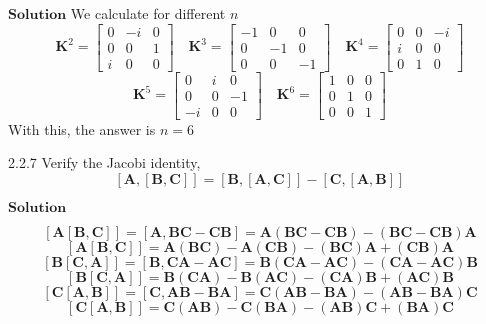 \documentclass{article}
\begin{document}
\begin{flushleft}
$\boxed{\textbf{Solution}}$ We calculate for different $n$
$$\mathbf{K}^2 = \begin{bmatrix}{0} & {-i} & {0} \\ {0} & {0} & {1} \\ {i} & {0} & {0}\end{bmatrix} \quad \mathbf{K}^3=\begin{bmatrix}{-1} & {0} & {0} \\ {0} & {-1} & {0} \\ {0} & {0} & {-1}\end{bmatrix} \quad \mathbf{K}^4 = \begin{bmatrix}{0} & {0} & {-i} \\ {i} & {0} & {0} \\ {0} & {1} & {0}\end{bmatrix}$$
$$\mathbf{K}^5 = \begin{bmatrix}{0} & {i} & {0} \\ {0} & {0} & {-1} \\ {-i} & {0} & {0}\end{bmatrix} \quad \mathbf{K}^6 = \begin{bmatrix}{1} & {0} & {0} \\ {0} & {1} & {0} \\ {0} & {0} & {1}\end{bmatrix}$$
With this, the answer is $n=6$


\newpage


\begin{mybox}{2.2.7}
Verify the Jacobi identity,
$$[\mathbf{A},[\mathbf{B}, \mathbf{C}]]=[\mathbf{B},[\mathbf{A}, \mathbf{C}]]-[\mathbf{C},[\mathbf{A}, \mathbf{B}]]$$
\end{mybox}

$\boxed{\textbf{Solution}}$ 

$$
[\mathbf{A}[\mathbf{B}, \mathbf{C}]]=[\mathbf{A}, \mathbf{B} \mathbf{C}-\mathbf{C} \mathbf{B}]=\mathbf{A}(\mathbf{B} \mathbf{C}-\mathbf{C} \mathbf{B})-(\mathbf{B} \mathbf{C}-\mathbf{C} \mathbf{B}) \mathbf{A} $$
$$[\mathbf{A}[\mathbf{B}, \mathbf{C}]]=\mathbf{A}(\mathbf{B} \mathbf{C})-\mathbf{A}(\mathbf{C} \mathbf{B})-(\mathbf{B} \mathbf{C}) \mathbf{A}+(\mathbf{C} \mathbf{B}) \mathbf{A} $$
$$[\mathbf{B}[\mathbf{C}, \mathbf{A}]]=[\mathbf{B}, \mathbf{C} \mathbf{A}-\mathbf{A} \mathbf{C}]=\mathbf{B}(\mathbf{C A}-\mathbf{A} \mathbf{C})-(\mathbf{C A}-\mathbf{A} \mathbf{C}) \mathbf{B} $$
$$[\mathbf{B}[\mathbf{C}, \mathbf{A}]]=\mathbf{B}(\mathbf{C} \mathbf{A})-\mathbf{B}(\mathbf{A} \mathbf{C})-(\mathbf{C} \mathbf{A}) \mathbf{B}+(\mathbf{A} \mathbf{C}) \mathbf{B} $$
$$[\mathbf{C}[\mathbf{A}, \mathbf{B}]]=[\mathbf{C}, \mathbf{A} \mathbf{B}-\mathbf{B} \mathbf{A}]=\mathbf{C}(\mathbf{A} \mathbf{B}-\mathbf{B} \mathbf{A})-(\mathbf{A} \mathbf{B}-\mathbf{B} \mathbf{A}) \mathbf{C} $$
$$[\mathbf{C}[\mathbf{A}, \mathbf{B}]]=\mathbf{C}(\mathbf{A} \mathbf{B})-\mathbf{C}(\mathbf{B} \mathbf{A})-(\mathbf{A} \mathbf{B}) \mathbf{C}+(\mathbf{B} \mathbf{A}) \mathbf{C} $$


\end{flushleft}
\end{document}
